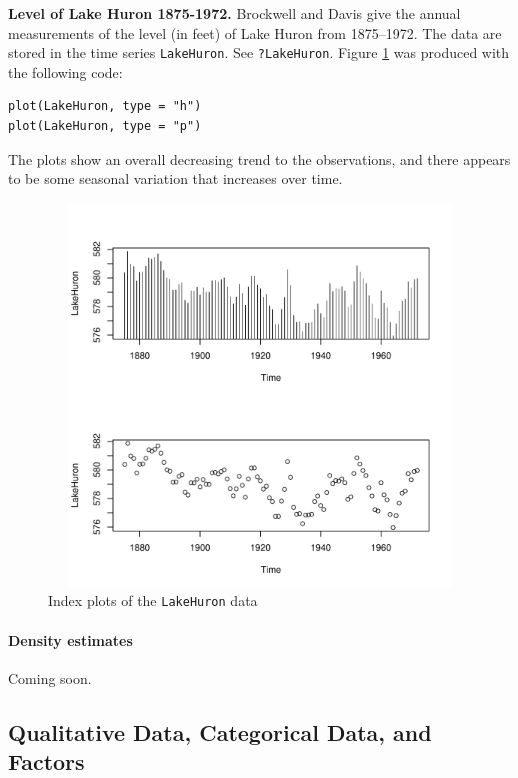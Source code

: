\documentclass[captions=tableheading]{scrbook}
\begin{document}
\begin{example}
\textbf{Level of Lake Huron 1875-1972.} Brockwell and Davis \cite{Brockwell1991} give the annual measurements of the level (in feet) of Lake Huron from 1875--1972. The data are stored in the time series \texttt{LakeHuron}. See \texttt{?LakeHuron}. Figure \ref{fig:indpl-lakehuron} was produced with the following code:


\begin{verbatim}
plot(LakeHuron, type = "h")
plot(LakeHuron, type = "p")
\end{verbatim}

The plots show an overall decreasing trend to the observations, and there appears to be some seasonal variation that increases over time. 





\begin{figure}[th]
    \includegraphics[width=5in, height=4in]{img/indpl-lakehuron.pdf}
    \caption{Index plots of the \texttt{LakeHuron} data}
    \label{fig:indpl-lakehuron}
  \end{figure}

\end{example}

\paragraph*{Density estimates}

Coming soon.
\subsection{Qualitative Data, Categorical Data, and Factors}
\label{sec-3-1-3}
\end{document}
